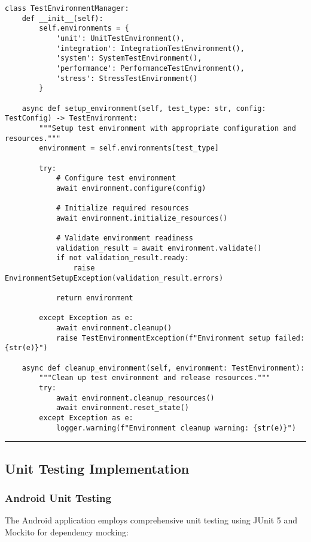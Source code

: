 \documentclass[12pt,a4paper]{report}
\begin{document}
\begin{verbatim}
class TestEnvironmentManager:
    def __init__(self):
        self.environments = {
            'unit': UnitTestEnvironment(),
            'integration': IntegrationTestEnvironment(),
            'system': SystemTestEnvironment(),
            'performance': PerformanceTestEnvironment(),
            'stress': StressTestEnvironment()
        }

    async def setup_environment(self, test_type: str, config: TestConfig) -> TestEnvironment:
        """Setup test environment with appropriate configuration and resources."""
        environment = self.environments[test_type]

        try:
            # Configure test environment
            await environment.configure(config)

            # Initialize required resources
            await environment.initialize_resources()

            # Validate environment readiness
            validation_result = await environment.validate()
            if not validation_result.ready:
                raise EnvironmentSetupException(validation_result.errors)

            return environment

        except Exception as e:
            await environment.cleanup()
            raise TestEnvironmentException(f"Environment setup failed: {str(e)}")

    async def cleanup_environment(self, environment: TestEnvironment):
        """Clean up test environment and release resources."""
        try:
            await environment.cleanup_resources()
            await environment.reset_state()
        except Exception as e:
            logger.warning(f"Environment cleanup warning: {str(e)}")
\end{verbatim}

\hrule

\subsection{Unit Testing Implementation}

\subsubsection{Android Unit Testing}

The Android application employs comprehensive unit testing using JUnit 5 and Mockito for dependency mocking:
\end{document}

